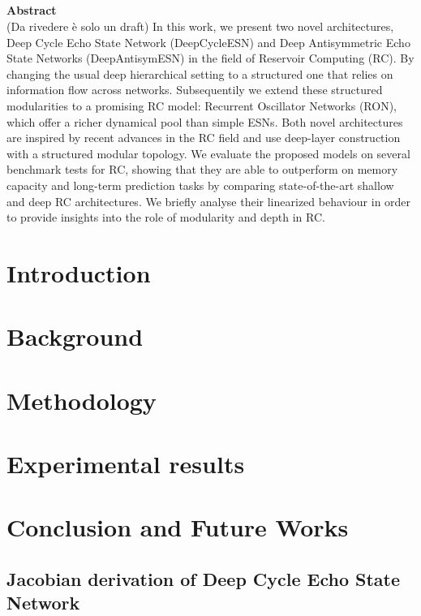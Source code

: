 \documentclass[
11pt, %
english, %
onehalfspacing, %
parskip, %
headsepline, %
]{MastersDoctoralThesis} %
\begin{document}
\section*{}
\thispagestyle{empty}
\vfill
\begin{center}
	\Large \textbf{Abstract}
	\\[0.5cm]
	\normalsize
(Da rivedere è solo un draft)
In this work, we present two novel architectures, Deep Cycle Echo State Network (DeepCycleESN) and Deep Antisymmetric Echo State Networks (DeepAntisymESN) in the field of Reservoir Computing (RC). By changing the usual deep hierarchical setting to a structured one that relies on information flow across networks.
Subsequentily we extend these structured modularities to a promising RC model: Recurrent Oscillator Networks (RON), which offer a richer dynamical pool than simple ESNs.
 Both novel architectures are inspired by recent advances in the RC field and use deep-layer construction with 
 a structured modular topology.
 We evaluate the proposed models on several benchmark tests for RC, showing that they are able to
 outperform on memory capacity and long-term prediction tasks by comparing state-of-the-art shallow and deep RC architectures.
 We briefly analyse their linearized behaviour in order to
 provide insights into the role of modularity and depth in RC.
\end{center}

\vfill
{
	\hypersetup{linkcolor=purple!30!black, linktoc=all}
	\tableofcontents
}


\chapter{Introduction}\label{ch:introduction}


\chapter{Background}\label{ch:background}


\chapter{Methodology}\label{ch:methodology}


\chapter{Experimental results}\label{ch:experiments}


\chapter{Conclusion and Future Works}\label{ch:conclusion}


%

\printbibliography

\begin{appendices}
\chapter{Jacobian derivation of Deep Cycle Echo State Network}\label{ch:appendix}

\end{appendices}
\end{document}
